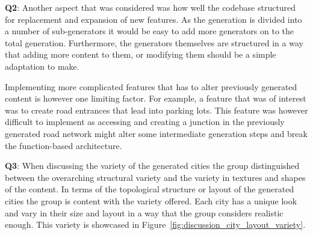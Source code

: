 \textbf{Q2}:
Another aspect that was considered was how well the codebase structured for replacement and expansion of new features.
As the generation is divided into a number of sub-generators it would be easy to add more generators on to the total generation.
Furthermore, the generators themselves are structured in a way that adding more content to them, or modifying them should be a simple adaptation to make. 

Implementing more complicated features that has to alter previously generated content is however one limiting factor.
For example, a feature that was of interest was to create road entrances that lead into parking lots.
This feature was however difficult to implement as accessing and creating a junction in the previously generated road network might alter some intermediate generation steps and break the function-based architecture.

\textbf{Q3}:
When discussing the variety of the generated cities the group distinguished between the overarching structural variety and the variety in textures and shapes of the content.
In terms of the topological structure or layout of the generated cities the group is content with the variety offered.
Each city has a unique look and vary in their size and layout in a way that the group considers realistic enough.
This variety is showcased in Figure~\ref{fig:discussion_city_layout_variety}.

